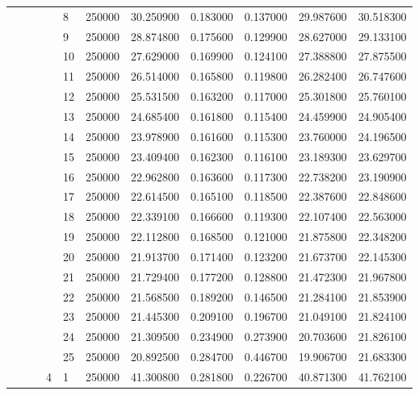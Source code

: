 \begin{tabular}{llllllrrrrr}
\cline{5-11}
 &  &  &  & 8 & 250000 & 30.250900 & 0.183000 & 0.137000 & 29.987600 & 30.518300 \\
\cline{5-11}
 &  &  &  & 9 & 250000 & 28.874800 & 0.175600 & 0.129900 & 28.627000 & 29.133100 \\
\cline{5-11}
 &  &  &  & 10 & 250000 & 27.629000 & 0.169900 & 0.124100 & 27.388800 & 27.875500 \\
\cline{5-11}
 &  &  &  & 11 & 250000 & 26.514000 & 0.165800 & 0.119800 & 26.282400 & 26.747600 \\
\cline{5-11}
 &  &  &  & 12 & 250000 & 25.531500 & 0.163200 & 0.117000 & 25.301800 & 25.760100 \\
\cline{5-11}
 &  &  &  & 13 & 250000 & 24.685400 & 0.161800 & 0.115400 & 24.459900 & 24.905400 \\
\cline{5-11}
 &  &  &  & 14 & 250000 & 23.978900 & 0.161600 & 0.115300 & 23.760000 & 24.196500 \\
\cline{5-11}
 &  &  &  & 15 & 250000 & 23.409400 & 0.162300 & 0.116100 & 23.189300 & 23.629700 \\
\cline{5-11}
 &  &  &  & 16 & 250000 & 22.962800 & 0.163600 & 0.117300 & 22.738200 & 23.190900 \\
\cline{5-11}
 &  &  &  & 17 & 250000 & 22.614500 & 0.165100 & 0.118500 & 22.387600 & 22.848600 \\
\cline{5-11}
 &  &  &  & 18 & 250000 & 22.339100 & 0.166600 & 0.119300 & 22.107400 & 22.563000 \\
\cline{5-11}
 &  &  &  & 19 & 250000 & 22.112800 & 0.168500 & 0.121000 & 21.875800 & 22.348200 \\
\cline{5-11}
 &  &  &  & 20 & 250000 & 21.913700 & 0.171400 & 0.123200 & 21.673700 & 22.145300 \\
\cline{5-11}
 &  &  &  & 21 & 250000 & 21.729400 & 0.177200 & 0.128800 & 21.472300 & 21.967800 \\
\cline{5-11}
 &  &  &  & 22 & 250000 & 21.568500 & 0.189200 & 0.146500 & 21.284100 & 21.853900 \\
\cline{5-11}
 &  &  &  & 23 & 250000 & 21.445300 & 0.209100 & 0.196700 & 21.049100 & 21.824100 \\
\cline{5-11}
 &  &  &  & 24 & 250000 & 21.309500 & 0.234900 & 0.273900 & 20.703600 & 21.826100 \\
\cline{5-11}
 &  &  &  & 25 & 250000 & 20.892500 & 0.284700 & 0.446700 & 19.906700 & 21.683300 \\
\cline{4-11} \cline{5-11}
 &  &  & \multirow[t]{25}{*}{4} & 1 & 250000 & 41.300800 & 0.281800 & 0.226700 & 40.871300 & 41.762100 \\

\end{tabular}
